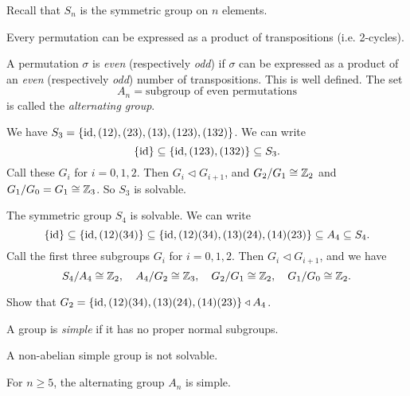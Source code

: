 \begin{remark}
  Recall that $S_n$ is the symmetric group on $n$
  elements.
\end{remark}

\begin{theorem}
  Every permutation can be expressed as a product of
  transpositions (i.e. 2-cycles).
\end{theorem}

\begin{definition}
  A permutation $\sigma$ is \emph{even} (respectively \emph{odd})
  if $\sigma$ can be expressed as a product of an
  \emph{even} (respectively \emph{odd}) number of transpositions.
  This is well defined. The set
  \[
    A_n = \text{subgroup of even permutations}
  \]
  is called the \emph{alternating group}.
\end{definition}

\begin{example}
  We have $S_3 = \{\mathrm{id}, (12), (23), (13), (123), (132)\}$.
  We can write
  \[
    \{\mathrm{id}\} \subseteq \{\mathrm{id}, (123), (132)\} \subseteq S_3.
  \]
  Call these $G_i$ for $i = 0, 1, 2$.
  Then $G_i \triangleleft G_{i + 1}$, and
  $G_2 / G_1 \cong \mathbb{Z}_2$ and $G_1 / G_0 = G_1 \cong \mathbb{Z}_3$.
  So $S_3$ is solvable.
\end{example}

\begin{example}
  The symmetric group $S_4$ is solvable. We can write
  \[
    \{\mathrm{id}\} \subseteq \{\mathrm{id}, (12)(34)\}
    \subseteq \{\mathrm{id}, (12)(34), (13)(24), (14)(23)\}
    \subseteq A_4 \subseteq S_4.
  \]
  Call the first three subgroups $G_i$ for $i = 0, 1, 2$.
  Then $G_i \triangleleft G_{i + 1}$, and we have
  \[
    S_4 / A_4 \cong \mathbb{Z}_2, \quad A_4 / G_2 \cong \mathbb{Z}_3,
    \quad G_2 / G_1 \cong \mathbb{Z}_2, \quad G_1 / G_0 \cong \mathbb{Z}_2.
  \]
\end{example}

\begin{exercise}
  Show that
  $G_2 = \{\mathrm{id}, (12)(34), (13)(24), (14)(23)\} \triangleleft A_4$.
\end{exercise}

\begin{definition}
  A group is \emph{simple} if it has no proper normal
  subgroups.
\end{definition}

\begin{remark}
  A non-abelian simple group is not solvable.
\end{remark}

\begin{theorem}
  For $n \ge 5$, the alternating group $A_n$ is simple.
\end{theorem}

